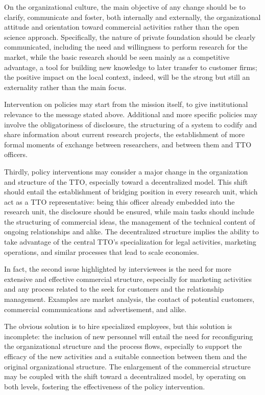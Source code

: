On the organizational culture, the main objective of any change should be to clarify, communicate and foster, both internally and externally, the organizational attitude and orientation toward commercial activities rather than the open science approach. Specifically, the nature of private foundation should be clearly communicated, including the need and willingness to perform research for the market, while the basic research should be seen mainly as a competitive advantage, a tool for building new knowledge to later transfer to customer firms; the positive impact on the local context, indeed, will be the strong but still an externality rather than the main focus. 

Intervention on policies may start from the mission itself, to give institutional relevance to the message stated above. Additional and more specific policies may involve the obligatoriness of disclosure, the structuring of a system to codify and share information about current research projects, the establishment of more formal moments of exchange between researchers, and between them and TTO officers.

Thirdly, policy interventions may consider a major change in the organization and structure of the TTO, especially toward a decentralized model. This shift should entail the establishment of bridging position in every research unit, which act as a TTO representative: being this officer already embedded into the research unit, the disclosure should be ensured, while main tasks should include the structuring of commercial ideas, the management of the technical content of ongoing relationships and alike. The decentralized structure implies the ability to take advantage of the central TTO's specialization for legal activities, marketing operations, and similar processes that lead to scale economies.

In fact, the second issue highlighted by interviewees is the need for more extensive and effective commercial structure, especially for marketing activities and any process related to the seek for customers and the relationship management. Examples are market analysis, the contact of potential customers, commercial communications and advertisement, and alike. 

The obvious solution is to hire specialized employees, but this solution is incomplete: the inclusion of new personnel will entail the need for reconfiguring the organizational structure and the process flows, especially to support the efficacy of the new activities and a suitable connection between them and the original organizational structure. The enlargement of the commercial structure may be coupled with the shift toward a decentralized model, by operating on both levels, fostering the effectiveness of the policy intervention.

